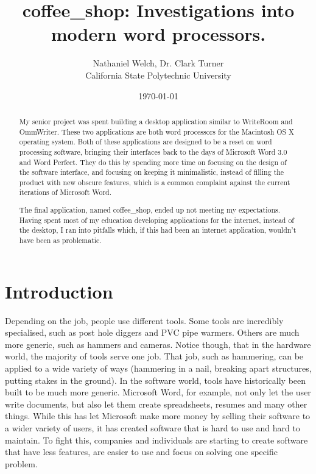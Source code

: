 \documentclass[10pt]{article}
\begin{document}
\title{\vfill coffee\_shop: Investigations into modern word processors.}
\author{
Nathaniel Welch, Dr. Clark Turner\vspace{10pt} \\
California State Polytechnic University\vspace{10pt} \\
}
\date{\today}
\maketitle

\doublespacing

\vfill
\begin{abstract}
My senior project was spent building a desktop application similar to WriteRoom and OmmWriter. These two applications are both word processors for the Macintosh OS X operating system. Both of these applications are designed to be a reset on word processing software, bringing their interfaces back to the days of Microsoft Word 3.0 and Word Perfect. They do this by spending more time on focusing on the design of the software interface, and focusing on keeping it minimalistic, instead of filling the product with new obscure features, which is a common complaint against the current iterations of Microsoft Word.

The final application, named coffee\_shop, ended up not meeting my expectations. Having spent most of my education developing applications for the internet, instead of the desktop, I ran into pitfalls which, if this had been an internet application, wouldn't have been as problematic.
\end{abstract}

\thispagestyle{empty}
\newpage
\singlespacing
\thispagestyle{empty}
\tableofcontents
\newpage

\newpage
\singlespacing
{}
\listoffigures
\newpage

\doublespacing

\section{Introduction}

Depending on the job, people use different tools. Some tools are incredibly specialised, such as post hole diggers and PVC pipe warmers. Others are much more generic, such as hammers and cameras. Notice though, that in the hardware world, the majority of tools serve one job. That job, such as hammering, can be applied to a wide variety of ways (hammering in a nail, breaking apart structures, putting stakes in the ground). In the software world, tools have historically been built to be much more generic. Microsoft Word, for example, not only let the user write documents, but also let them create spreadsheets, resumes and many other things. While this has let Microsoft make more money by selling their software to a wider variety of users, it has created software that is hard to use and hard to maintain. To fight this, companies and individuals are starting to create software that have less features, are easier to use and focus on solving one specific problem.
\end{document}
